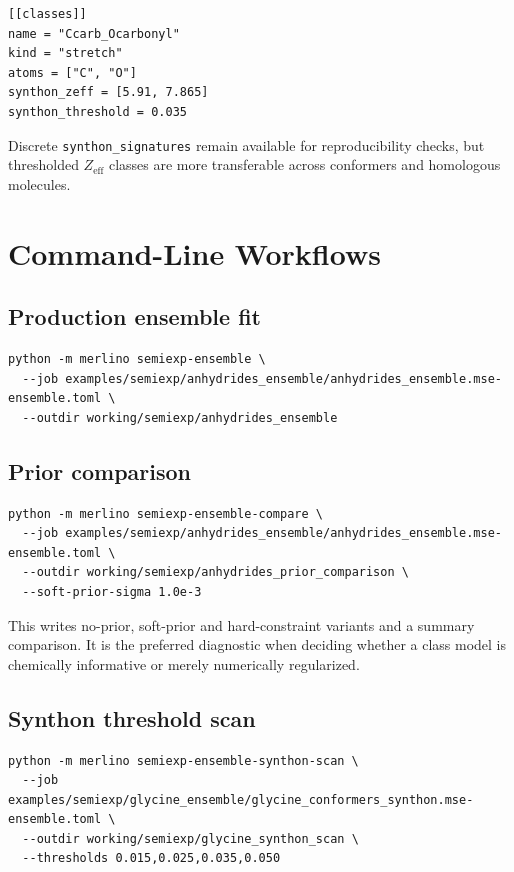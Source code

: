 \documentclass[11pt]{article}
\newcommand{\zeff}{Z_\mathrm{eff}}
\begin{document}
\begin{lstlisting}[style=merlino]
[[classes]]
name = "Ccarb_Ocarbonyl"
kind = "stretch"
atoms = ["C", "O"]
synthon_zeff = [5.91, 7.865]
synthon_threshold = 0.035
\end{lstlisting}

\noindent
Discrete \texttt{synthon\_signatures} remain available for reproducibility
checks, but thresholded \(\zeff\) classes are more transferable across
conformers and homologous molecules.

\section{Command-Line Workflows}

\subsection{Production ensemble fit}

\begin{lstlisting}[style=merlino]
python -m merlino semiexp-ensemble \
  --job examples/semiexp/anhydrides_ensemble/anhydrides_ensemble.mse-ensemble.toml \
  --outdir working/semiexp/anhydrides_ensemble
\end{lstlisting}

\subsection{Prior comparison}

\begin{lstlisting}[style=merlino]
python -m merlino semiexp-ensemble-compare \
  --job examples/semiexp/anhydrides_ensemble/anhydrides_ensemble.mse-ensemble.toml \
  --outdir working/semiexp/anhydrides_prior_comparison \
  --soft-prior-sigma 1.0e-3
\end{lstlisting}

\noindent
This writes no-prior, soft-prior and hard-constraint variants and a summary
comparison.  It is the preferred diagnostic when deciding whether a class model
is chemically informative or merely numerically regularized.

\subsection{Synthon threshold scan}

\begin{lstlisting}[style=merlino]
python -m merlino semiexp-ensemble-synthon-scan \
  --job examples/semiexp/glycine_ensemble/glycine_conformers_synthon.mse-ensemble.toml \
  --outdir working/semiexp/glycine_synthon_scan \
  --thresholds 0.015,0.025,0.035,0.050
\end{lstlisting}
\end{document}
